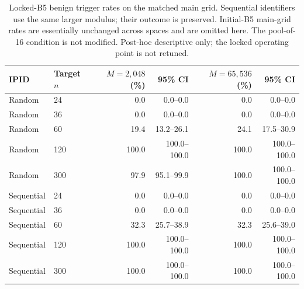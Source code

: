\begin{table}[t]
\centering
\caption{Locked-B5 benign trigger rates on the matched main grid. Sequential identifiers use the same larger modulus; their outcome is preserved. Initial-B5 main-grid rates are essentially unchanged across spaces and are omitted here. The pool-of-16 condition is not modified. Post-hoc descriptive only; the locked operating point is not retuned.}
\label{tab:e1-ipid-maingrid}
\begingroup
\fontsize{9}{10.8}\selectfont
\setlength{\tabcolsep}{3pt}
\begin{tabular}{llrrrr}
\hline
IPID & Target $n$ & $M=2{,}048$ (\%) & 95\% CI & $M=65{,}536$ (\%) & 95\% CI \\
\hline
Random & 24 & 0.0 & 0.0--0.0 & 0.0 & 0.0--0.0 \\
Random & 36 & 0.0 & 0.0--0.0 & 0.0 & 0.0--0.0 \\
Random & 60 & 19.4 & 13.2--26.1 & 24.1 & 17.5--30.9 \\
Random & 120 & 100.0 & 100.0--100.0 & 100.0 & 100.0--100.0 \\
Random & 300 & 97.9 & 95.1--99.9 & 100.0 & 100.0--100.0 \\
Sequential & 24 & 0.0 & 0.0--0.0 & 0.0 & 0.0--0.0 \\
Sequential & 36 & 0.0 & 0.0--0.0 & 0.0 & 0.0--0.0 \\
Sequential & 60 & 32.3 & 25.7--38.9 & 32.3 & 25.6--39.0 \\
Sequential & 120 & 100.0 & 100.0--100.0 & 100.0 & 100.0--100.0 \\
Sequential & 300 & 100.0 & 100.0--100.0 & 100.0 & 100.0--100.0 \\
\hline
\end{tabular}
\endgroup
\end{table}
